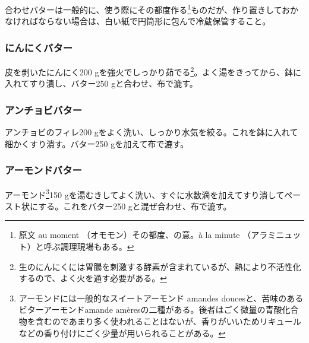 合わせバターは一般的に、使う際にその都度作る\footnote{原文 au moment
  （オモモン）その都度、の意。à la minute
  （アラミニュット）と呼ぶ調理現場もある。}ものだが、作り置きしておかなければならない場合は、白い紙で円筒形に包んで冷蔵保管すること。
\begin{recette}
\hypertarget{beurre-d-ail}{%
\subsubsection{にんにくバター}\label{beurre-d-ail}}



皮を剥いたにんにく200 gを強火でしっかり茹でる\footnote{生のにんにくには胃腸を刺激する酵素が含まれているが、熱により不活性化するので、よく火を通す必要がある。}。よく湯をきってから、鉢に入れてすり潰し、バター250
gと合わせ、布で漉す。

\hypertarget{beurre-d-anchois}{%
\subsubsection{アンチョビバター}\label{beurre-d-anchois}}



アンチョビのフィレ200
gをよく洗い、しっかり水気を絞る。これを鉢に入れて細かくすり潰す。バター250
gを加えて布で漉す。

\hypertarget{beurre-d-amande}{%
\subsubsection{アーモンドバター}\label{beurre-d-amande}}



アーモンド\footnote{アーモンドには一般的なスイートアーモンド amandes
  doucesと、苦味のあるビターアーモンドamande
  amèresの二種がある。後者はごく微量の青酸化合物を含むのであまり多く使われることはないが、香りがいいためリキュールなどの香り付けにごく少量が用いられることがある。}150
gを湯むきしてよく洗い、すぐに水数滴を加えてすり潰してペースト状にする。これをバター250
gと混ぜ合わせ、布で漉す。


\end{recette}

